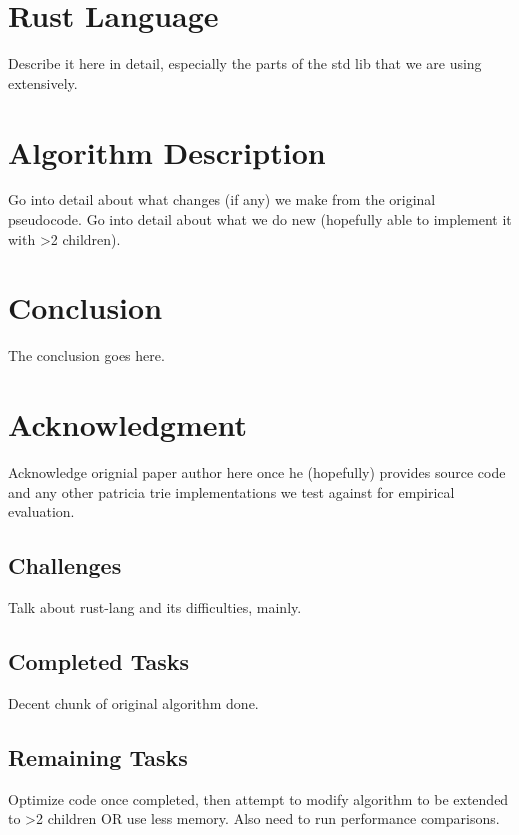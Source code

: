 \documentclass[conference]{IEEEtran}
\begin{document}
\section{Rust Language}
Describe it here in detail, especially the parts of the std lib that we are using extensively.


\section{Algorithm Description}
Go into detail about what changes (if any) we make from the original pseudocode. Go into detail about what we do new (hopefully able to implement it with >2 children).


\section{Conclusion}
The conclusion goes here.


\section{Acknowledgment}
Acknowledge orignial paper author here once he (hopefully) provides source code and any other patricia trie implementations we test against for empirical evaluation.


\appendix
\subsection{Challenges}
Talk about rust-lang and its difficulties, mainly.


\subsection{Completed Tasks}
Decent chunk of original algorithm done.


\subsection{Remaining Tasks}
Optimize code once completed, then attempt to modify algorithm to be extended to >2 children OR use less memory.
Also need to run performance comparisons.




\end{document}
